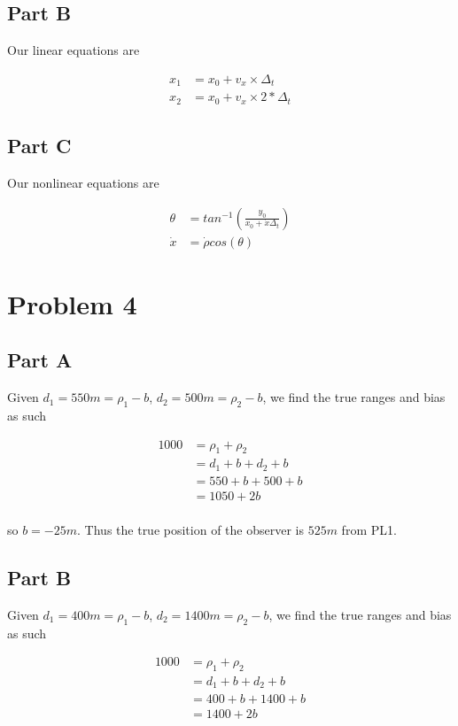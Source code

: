 \documentclass[]{article}
\begin{document}
\subsection{Part B}

Our linear equations are

\begin{align*}
	x_1 &= x_0 + v_x \times \Delta_t \\
	x_2 &= x_0 + v_x \times 2*\Delta_t
\end{align*}

\subsection{Part C}

Our nonlinear equations are

\begin{align*}
	\theta &= tan^{-1}(\frac{y_0}{x_0 + \dot{x}\Delta_t}) \\
	\dot{x} &= \dot{\rho}cos(\theta)
\end{align*}


\section{Problem 4}

\subsection{Part A}

Given $d_1 = 550m = \rho_1 - b$, $d_2 = 500m = \rho_2 - b$, we find the true ranges and bias as such

\begin{align*}
	1000 &= \rho_1 + \rho_2 \\
	&=  d_1 + b + d_2 + b \\
	&= 550 + b + 500 + b \\
	&= 1050 + 2b \\
\end{align*}

so $b = -25m$. 
Thus the true position of the observer is $525m$ from PL1.

\subsection{Part B}

Given $d_1 = 400m = \rho_1 - b$, $d_2 = 1400m = \rho_2 - b$, we find the true ranges and bias as such

\begin{align*}
1000 &= \rho_1 + \rho_2 \\
&=  d_1 + b + d_2 + b \\
&= 400 + b + 1400 + b \\
&= 1400 + 2b \\
\end{align*}
\end{document}
